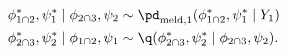 \begin{align}
  \phi_{1 \cap 2}^{*}, \psi_{1}^{*} \mid \phi_{2 \cap 3}, \psi_{2} &\sim \pd_{\text{meld}, 1}(\phi_{1 \cap 2}^{*}, \psi_{1}^{*} \mid Y_{1}) \\
  \phi_{2 \cap 3}^{*}, \psi_{2}^{*} \mid \phi_{1 \cap 2}, \psi_{1} &\sim \q(\phi_{2 \cap 3}^{*}, \psi_{2}^{*} \mid \phi_{2 \cap 3}, \psi_{2}).
  \label{eqn:stage-two-gibbs-updates}
\end{align}